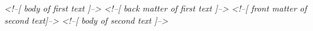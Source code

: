 \documentclass[11pt,twoside]{article}\makeatletter
\begin{document}
\begin{shaded}
\textit{<!--[ body of first text  ]-->}\mbox{}\newline 
\hspace*{6pt}\hspace*{6pt}\hspace*{6pt}\mbox{}\newline 
\hspace*{6pt}\hspace*{6pt}\hspace*{6pt}\mbox{}\newline 
\textit{<!--[ back matter of first text ]-->}\mbox{}\newline 
\hspace*{6pt}\hspace*{6pt}\hspace*{6pt}\mbox{}\newline 
\hspace*{6pt}\hspace*{6pt}\mbox{}\newline 
\hspace*{6pt}\hspace*{6pt}\mbox{}\newline 
\hspace*{6pt}\hspace*{6pt}\hspace*{6pt}\mbox{}\newline 
\textit{<!--[ front matter of second text]-->}\mbox{}\newline 
\hspace*{6pt}\hspace*{6pt}\hspace*{6pt}\mbox{}\newline 
\hspace*{6pt}\hspace*{6pt}\hspace*{6pt}\mbox{}\newline 
\textit{<!--[ body of second text  ]-->}\mbox{}\newline 
\hspace*{6pt}\hspace*{6pt}\hspace*{6pt}\mbox{}\newline 

\end{shaded}
\end{document}
